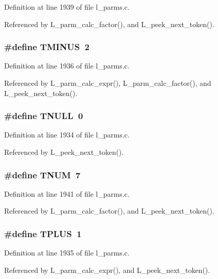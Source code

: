 Definition at line 1939 of file l\_\-parms.c.

Referenced by L\_\-parm\_\-calc\_\-factor(), and L\_\-peek\_\-next\_\-token().
\subsubsection{\setlength{\rightskip}{0pt plus 5cm}\#define TMINUS~2}\label{l__parms_8c_40a9113c885ef2de24d8242ee97238d8}




Definition at line 1936 of file l\_\-parms.c.

Referenced by L\_\-parm\_\-calc\_\-expr(), L\_\-parm\_\-calc\_\-factor(), and L\_\-peek\_\-next\_\-token().
\subsubsection{\setlength{\rightskip}{0pt plus 5cm}\#define TNULL~0}\label{l__parms_8c_9c0558ad765472aac57bb0954a80ae97}




Definition at line 1934 of file l\_\-parms.c.

Referenced by L\_\-peek\_\-next\_\-token().
\subsubsection{\setlength{\rightskip}{0pt plus 5cm}\#define TNUM~7}\label{l__parms_8c_d00501132f47c93fefe8907a7023e0f0}




Definition at line 1941 of file l\_\-parms.c.

Referenced by L\_\-parm\_\-calc\_\-factor(), and L\_\-peek\_\-next\_\-token().
\subsubsection{\setlength{\rightskip}{0pt plus 5cm}\#define TPLUS~1}\label{l__parms_8c_9108d631d79d040b0634d924ecddf65f}




Definition at line 1935 of file l\_\-parms.c.

Referenced by L\_\-parm\_\-calc\_\-expr(), and L\_\-peek\_\-next\_\-token().
